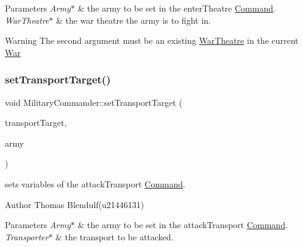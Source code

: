 \begin{DoxyParams}{Parameters}
{\em Army$\ast$} & the army to be set in the enter\+Theatre \mbox{\hyperlink{class_command}{Command}}. \\
\hline
{\em War\+Theatre$\ast$} & the war theatre the army is to fight in. \\
\hline
\end{DoxyParams}
\begin{DoxyWarning}{Warning}
The second argument must be an existing \mbox{\hyperlink{class_war_theatre}{War\+Theatre}} in the current \mbox{\hyperlink{class_war}{War}} 
\end{DoxyWarning}
\mbox{\label{class_military_commander_a3482b017f78a33581ee32fb3cad7e3e0}} 
\subsubsection{\texorpdfstring{setTransportTarget()}{setTransportTarget()}}
{\footnotesize\ttfamily void Military\+Commander\+::set\+Transport\+Target (\begin{DoxyParamCaption}\item[{\mbox{\hyperlink{class_country}{Country}} $\ast$}]{transport\+Target,  }\item[{\mbox{\hyperlink{class_army}{Army}} $\ast$}]{army }\end{DoxyParamCaption})}



sets variables of the attack\+Transport \mbox{\hyperlink{class_command}{Command}}. 

\begin{DoxyAuthor}{Author}
Thomas Blendulf(u21446131) 
\end{DoxyAuthor}

\begin{DoxyParams}{Parameters}
{\em Army$\ast$} & the army to be set in the attack\+Transport \mbox{\hyperlink{class_command}{Command}}. \\
\hline
{\em Transporter$\ast$} & the transport to be attacked. \\
\hline
\end{DoxyParams}
